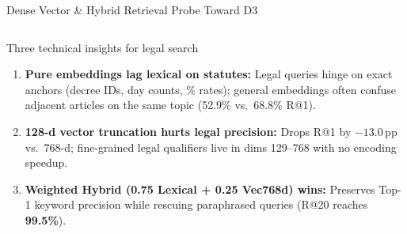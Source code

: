 \documentclass[aspectratio=1610,11pt]{beamer}
\newcommand{\pp}{\,pp\xspace}
\begin{document}
\begin{frame}{Dense Vector \& Hybrid Retrieval Probe Toward D3}
\begin{columns}[T]
    \begin{alertblock}{Three technical insights for legal search}
      \scriptsize
      \begin{enumerate}\scriptsize
        \item \textbf{Pure embeddings lag lexical on statutes:} Legal queries hinge on exact anchors (decree IDs, day counts, \% rates); general embeddings often confuse adjacent articles on the same topic (52.9\% vs.\ 68.8\% R@1).
        \item \textbf{128-d vector truncation hurts legal precision:} Drops R@1 by $-13.0$\pp vs.\ 768-d; fine-grained legal qualifiers live in dims 129--768 with no encoding speedup.
        \item \textbf{Weighted Hybrid (0.75 Lexical + 0.25 Vec768d) wins:} Preserves Top-1 keyword precision while rescuing paraphrased queries (R@20 reaches \textbf{99.5\%}).
      \end{enumerate}
    \end{alertblock}
  \end{columns}
\end{frame}
\end{document}
